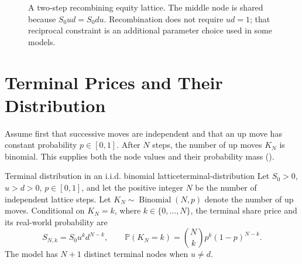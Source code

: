 \documentclass[11pt]{article}
\newcommand{\Pmeasure}{\mathbb{P}}
\begin{document}
\begin{figure}[ht]
  \centering
  \caption{A two-step recombining equity lattice. The middle node is shared because $S_0ud=S_0du$. Recombination does not require $ud=1$; that reciprocal constraint is an additional parameter choice used in some models.}
  \label{fig:equity-lattice}
\end{figure}

\section{Terminal Prices and Their Distribution}

Assume first that successive moves are independent and that an up move has constant probability $p\in[0,1]$. After $N$ steps, the number of up moves $K_N$ is binomial. This supplies both the node values and their probability mass ().

\begin{proposition}{Terminal distribution in an i.i.d. binomial lattice}{terminal-distribution}
Let $S_0>0$, $u>d>0$, $p\in[0,1]$, and let the positive integer $N$ be the number of independent lattice steps. Let $K_N\sim\operatorname{Binomial}(N,p)$ denote the number of up moves. Conditional on $K_N=k$, where $k\in\{0,\ldots,N\}$, the terminal share price and its real-world probability are
\begin{equation}
  \label{eq:terminal-distribution}
  S_{N,k}=S_0u^kd^{N-k},
  \qquad
  \Pmeasure(K_N=k)=\binom{N}{k}p^k(1-p)^{N-k}.
\end{equation}
The model has $N+1$ distinct terminal nodes when $u\neq d$.
\end{proposition}
\end{document}
